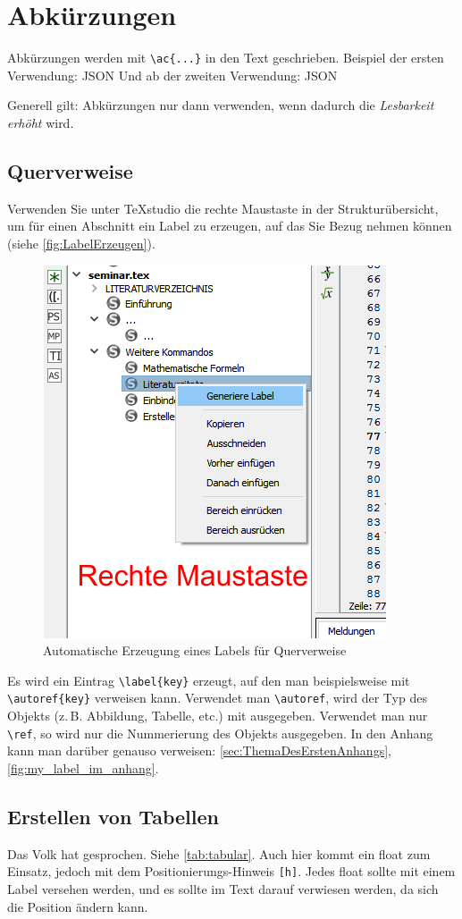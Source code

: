 \section{Abkürzungen}
\label{sec:Abkuerzungen}
Abkürzungen werden mit \lstinline|\ac{...}| in den Text geschrieben. Beispiel der ersten Verwendung: \ac{JSON}
Und ab der zweiten Verwendung: \ac{JSON}

Generell gilt: Abkürzungen nur dann verwenden, wenn dadurch die \emph{Lesbarkeit erhöht} wird.


\subsection{Querverweise}\label{sec:querverweise}
Verwenden Sie unter TeXstudio die rechte Maustaste in der Strukturübersicht, um für einen Abschnitt ein Label zu erzeugen, auf das Sie Bezug nehmen können (siehe \autoref{fig:LabelErzeugen}).

\begin{figure}
\centering
\includegraphics[width=0.4\linewidth]{bilder/LabelErzeugen}
\caption{Automatische Erzeugung eines Labels für Querverweise}
\label{fig:LabelErzeugen}
\end{figure}

Es wird ein Eintrag \verb|\label{key}| erzeugt, auf den man beispielsweise mit
\verb|\autoref{key}| verweisen kann. Verwendet man \verb|\autoref|, wird der Typ des Objekts
(z.\,B. Abbildung, Tabelle, etc.) mit ausgegeben. Verwendet man nur \verb|\ref|,
so wird nur die Nummerierung des Objekts ausgegeben. In den Anhang kann man darüber genauso verweisen: \autoref{sec:ThemaDesErstenAnhangs}, \autoref{fig:my_label_im_anhang}.

\subsection{Erstellen von Tabellen}

Das Volk hat gesprochen. Siehe \autoref{tab:tabular}. Auch hier kommt ein float zum Einsatz, jedoch mit dem Positionierungs-Hinweis \verb|[h]|. Jedes float sollte mit einem Label versehen werden, und es sollte im Text darauf verwiesen werden, da sich die Position ändern kann.

